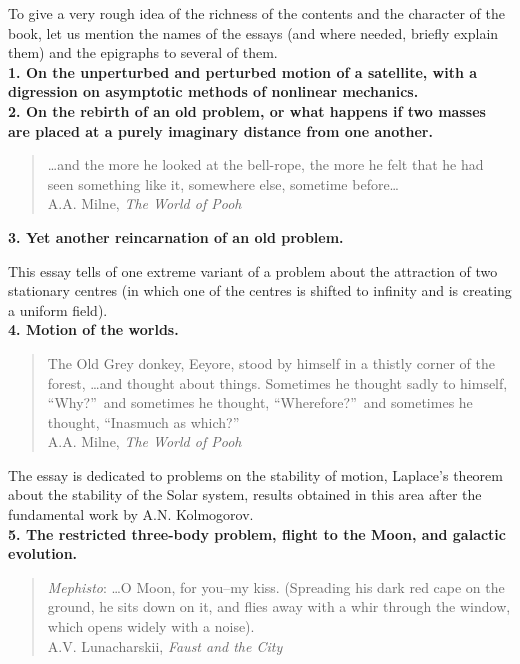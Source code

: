 \documentclass[12pt]{amsart}
\begin{document}
To give a very rough idea of the richness of the contents and the character of
the book, let us mention the names of the essays (and where needed, briefly
explain them) and the epigraphs to several of them.\\

\noindent\textbf{1. On the unperturbed and perturbed motion of a satellite, with
a digression on asymptotic methods of nonlinear mechanics.}\\

\noindent\textbf{2. On the rebirth of an old problem, or what happens if two
masses are placed at a purely imaginary distance from one another.}

\begin{quote}
\dots and the more he looked at the bell-rope, the more he felt that
he had seen something like it, somewhere else, sometime before\dots\\

A.A. Milne, \textit{The World of Pooh}
\end{quote}

\noindent\textbf{3. Yet another reincarnation of an old problem.}

This essay tells of one extreme variant of a problem about the attraction of two
stationary centres (in which one of the centres is shifted to infinity and is
creating a uniform field).\\

\noindent\textbf{4. Motion of the worlds.}

\begin{quote}
\indent The Old Grey donkey, Eeyore, stood by himself in a thistly corner of the
forest, \dots and thought about things.
Sometimes he thought sadly to himself, ``Why?''\ and sometimes he thought,
``Wherefore?''\ and sometimes he thought, ``Inasmuch as which?''\\

A.A. Milne, \textit{The World of Pooh}
\end{quote}

The essay is dedicated to problems on the stability of motion, Laplace's theorem
about the stability of the Solar system, results obtained in this area after the
fundamental work by A.N. Kolmogorov.\\

\noindent\textbf{5. The restricted three-body problem, flight to the Moon, and
galactic evolution.}

\begin{quote}
\indent\textit{Mephisto}: \dots O Moon, for you--my kiss.
(Spreading his dark red cape on the ground, he sits down on it, and flies away
with a whir through the window, which opens widely with a noise).\\

A.V. Lunacharskii, \textit{Faust and the City}
\end{quote}
\end{document}
